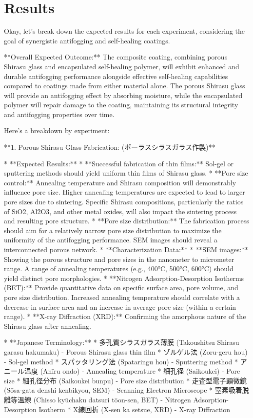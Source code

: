 \documentclass{article}
\begin{document}
\section{Results}
Okay, let's break down the expected results for each experiment, considering the goal of synergistic antifogging and self-healing coatings.

**Overall Expected Outcome:** The composite coating, combining porous Shirasu glass and encapsulated self-healing polymer, will exhibit enhanced and durable antifogging performance alongside effective self-healing capabilities compared to coatings made from either material alone.  The porous Shirasu glass will provide an antifogging effect by absorbing moisture, while the encapsulated polymer will repair damage to the coating, maintaining its structural integrity and antifogging properties over time.

Here's a breakdown by experiment:

**1. Porous Shirasu Glass Fabrication: (ポーラスシラスガラス作製)**

*   **Expected Results:**
    *   **Successful fabrication of thin films:**  Sol-gel or sputtering methods should yield uniform thin films of Shirasu glass.
    *   **Pore size control:**  Annealing temperature and Shirasu composition will demonstrably influence pore size. Higher annealing temperatures are expected to lead to larger pore sizes due to sintering. Specific Shirasu compositions, particularly the ratios of SiO2, Al2O3, and other metal oxides, will also impact the sintering process and resulting pore structure.
    *   **Pore size distribution:**  The fabrication process should aim for a relatively narrow pore size distribution to maximize the uniformity of the antifogging performance.  SEM images should reveal a interconnected porous network.
    *   **Characterization Data:**
        *   **SEM images:** Showing the porous structure and pore sizes in the nanometer to micrometer range.  A range of annealing temperatures (e.g., 400°C, 500°C, 600°C) should yield distinct pore morphologies.
        *   **Nitrogen Adsorption-Desorption Isotherms (BET):**  Provide quantitative data on specific surface area, pore volume, and pore size distribution.  Increased annealing temperature should correlate with a decrease in surface area and an increase in average pore size (within a certain range).
        *   **X-ray Diffraction (XRD):** Confirming the amorphous nature of the Shirasu glass after annealing.

*   **Japanese Terminology:**
    *   多孔質シラスガラス薄膜 (Takoushitsu Shirasu garasu hakumaku) - Porous Shirasu glass thin film
    *   ゾルゲル法 (Zoru-geru hou) - Sol-gel method
    *   スパッタリング法 (Spataringu hou) - Sputtering method
    *   アニール温度 (Anīru ondo) - Annealing temperature
    *   細孔径 (Saikoukei) - Pore size
    *   細孔径分布 (Saikoukei bunpu) - Pore size distribution
    *   走査型電子顕微鏡 (Sōsa-gata denshi kenbikyou, SEM) - Scanning Electron Microscope
    *   窒素吸着脱離等温線 (Chisso kyūchaku datsuri tōon-sen, BET) - Nitrogen Adsorption-Desorption Isotherm
    *   X線回折 (X-sen ka setsue, XRD) - X-ray Diffraction
\end{document}
